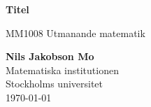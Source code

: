 \begin{titlepage}
    \begin{center}
        \vspace*{1cm}
            
        \Huge
        \textbf{Titel}
            
        \vspace{0.5cm}
        \LARGE
        MM1008 Utmanande matematik

        \vfill
            
        \vspace{0.8cm}
            
        \Large
        \textbf{Nils Jakobson Mo} \\
        Matematiska institutionen\\
        Stockholms universitet\\
        \today
            
    \end{center}
\end{titlepage}